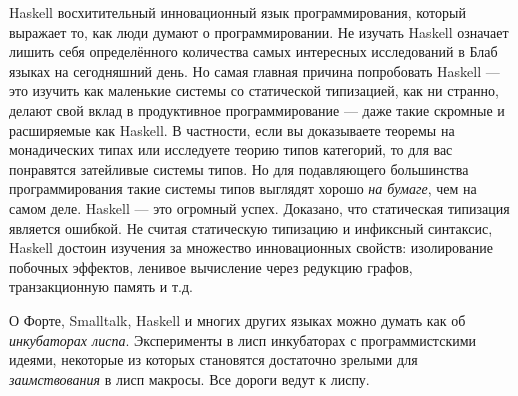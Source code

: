 Haskell восхитительный инновационный язык программирования, который выражает то, как люди думают о программировании. Не изучать Haskell означает лишить себя определённого количества самых интересных исследований в Блаб языках на сегодняшний день. Но самая главная причина попробовать Haskell --- это изучить как маленькие системы со статической типизацией, как ни странно, делают свой вклад в продуктивное программирование --- даже такие скромные и расширяемые как Haskell. В частности, если вы доказываете теоремы на монадических типах или исследуете теорию типов категорий, то для вас понравятся затейливые системы типов. Но для подавляющего большинства программирования такие системы типов выглядят хорошо \emph{на бумаге}, чем на самом деле. Haskell --- это огромный успех. Доказано, что статическая типизация является ошибкой. Не считая статическую типизацию и инфиксный синтаксис, Haskell достоин изучения за множество инновационных свойств: изолирование побочных эффектов, ленивое вычисление через редукцию графов, транзакционную память и т.д.

О Форте, Smalltalk, Haskell и многих других языках можно думать как об \emph{инкубаторах лиспа}. Эксперименты в лисп инкубаторах с программистскими идеями, некоторые из которых становятся достаточно зрелыми для \emph{заимствования} в лисп макросы. Все дороги ведут к лиспу.

